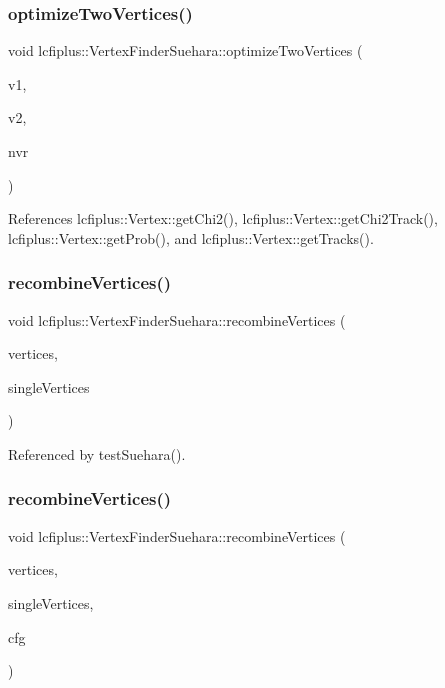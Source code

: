 \subsubsection{optimize\+Two\+Vertices()}
{\footnotesize\ttfamily void lcfiplus\+::\+Vertex\+Finder\+Suehara\+::optimize\+Two\+Vertices (\begin{DoxyParamCaption}\item[{\textbf{ Vertex} $\ast$\&}]{v1,  }\item[{\textbf{ Vertex} $\ast$\&}]{v2,  }\item[{int}]{nvr }\end{DoxyParamCaption})}



References lcfiplus\+::\+Vertex\+::get\+Chi2(), lcfiplus\+::\+Vertex\+::get\+Chi2\+Track(), lcfiplus\+::\+Vertex\+::get\+Prob(), and lcfiplus\+::\+Vertex\+::get\+Tracks().

\mbox{\label{namespacelcfiplus_1_1VertexFinderSuehara_a97a5fa5cd377e7acfee6671225fe1a9b}} 
\subsubsection{recombine\+Vertices()\hspace{0.1cm}{\footnotesize\ttfamily [1/2]}}
{\footnotesize\ttfamily void lcfiplus\+::\+Vertex\+Finder\+Suehara\+::recombine\+Vertices (\begin{DoxyParamCaption}\item[{vector$<$ \textbf{ Vertex} $\ast$$>$ \&}]{vertices,  }\item[{vector$<$ \textbf{ Vertex} $\ast$$>$ \&}]{single\+Vertices }\end{DoxyParamCaption})}



Referenced by test\+Suehara().

\mbox{\label{namespacelcfiplus_1_1VertexFinderSuehara_ab963db09bcb3eac74990528e291e76e8}} 
\subsubsection{recombine\+Vertices()\hspace{0.1cm}{\footnotesize\ttfamily [2/2]}}
{\footnotesize\ttfamily void lcfiplus\+::\+Vertex\+Finder\+Suehara\+::recombine\+Vertices (\begin{DoxyParamCaption}\item[{vector$<$ \textbf{ Vertex} $\ast$$>$ \&}]{vertices,  }\item[{vector$<$ \textbf{ Vertex} $\ast$$>$ \&}]{single\+Vertices,  }\item[{\textbf{ Vertex\+Finder\+Suehara\+Config} \&}]{cfg }\end{DoxyParamCaption})}

